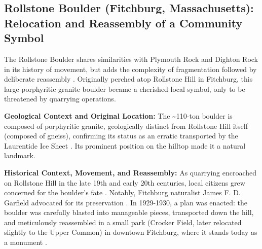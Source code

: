 \documentclass[
11pt, %
english, %
singlespacing, %
headsepline, %
]{MastersDoctoralThesis} %
\begin{document}
\subsection{Rollstone Boulder (Fitchburg, Massachusetts): Relocation and Reassembly of a Community Symbol}
\label{subsec:rollstone}

The Rollstone Boulder shares similarities with Plymouth Rock and Dighton Rock in its history of movement, but adds the complexity of fragmentation followed by deliberate reassembly \cite{googleLewistonEvening, telegramWorcesterCounty}. Originally perched atop Rollstone Hill in Fitchburg, this large porphyritic granite boulder became a cherished local symbol, only to be threatened by quarrying operations.

\textbf{Geological Context and Original Location:} The \textasciitilde110-ton boulder is composed of porphyritic granite, geologically distinct from Rollstone Hill itself (composed of gneiss), confirming its status as an erratic transported by the Laurentide Ice Sheet \cite{mindatMineralsRollstone, Hitchcock1841}. Its prominent position on the hilltop made it a natural landmark.

\textbf{Historical Context, Movement, and Reassembly:} As quarrying encroached on Rollstone Hill in the late 19th and early 20th centuries, local citizens grew concerned for the boulder's fate \cite{googleLewistonEvening, telegramWorcesterCounty}. Notably, Fitchburg naturalist James F. D. Garfield advocated for its preservation \cite{googleLewistonEvening}. In 1929-1930, a plan was enacted: the boulder was carefully blasted into manageable pieces, transported down the hill, and meticulously reassembled in a small park (Crocker Field, later relocated slightly to the Upper Common) in downtown Fitchburg, where it stands today as a monument \cite{googleLewistonEvening, telegramWorcesterCounty}.
\end{document}
